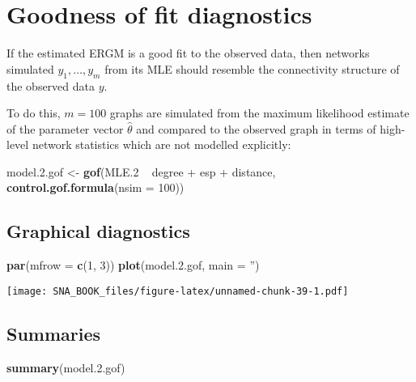 \documentclass[]{book}
\newenvironment{Shaded}{\begin{snugshade}}{\end{snugshade}}
\newcommand{\KeywordTok}[1]{\textcolor[rgb]{0.13,0.29,0.53}{\textbf{{#1}}}}
\newcommand{\DataTypeTok}[1]{\textcolor[rgb]{0.13,0.29,0.53}{{#1}}}
\newcommand{\DecValTok}[1]{\textcolor[rgb]{0.00,0.00,0.81}{{#1}}}
\newcommand{\FloatTok}[1]{\textcolor[rgb]{0.00,0.00,0.81}{{#1}}}
\newcommand{\StringTok}[1]{\textcolor[rgb]{0.31,0.60,0.02}{{#1}}}
\newcommand{\NormalTok}[1]{{#1}}
\begin{document}
\section{Goodness of fit
diagnostics}\label{goodness-of-fit-diagnostics-1}

If the estimated ERGM is a good fit to the observed data, then networks
simulated \(y_1, \dots, y_m\) from its MLE should resemble the
connectivity structure of the observed data \(y\).

To do this, \(m = 100\) graphs are simulated from the maximum likelihood
estimate of the parameter vector \(\hat{\theta}\) and compared to the
observed graph in terms of high-level network statistics which are not
modelled explicitly:

\begin{Shaded}
\begin{Highlighting}[]
\NormalTok{model}\FloatTok{.2}\NormalTok{.gof <-}\StringTok{ }\KeywordTok{gof}\NormalTok{(MLE}\FloatTok{.2} \NormalTok{~}\StringTok{ }\NormalTok{degree +}\StringTok{ }\NormalTok{esp +}\StringTok{ }\NormalTok{distance,}
                   \KeywordTok{control.gof.formula}\NormalTok{(}\DataTypeTok{nsim =} \DecValTok{100}\NormalTok{))}
\end{Highlighting}
\end{Shaded}

\subsection{Graphical diagnostics}\label{graphical-diagnostics-1}

\begin{Shaded}
\begin{Highlighting}[]
\KeywordTok{par}\NormalTok{(}\DataTypeTok{mfrow =} \KeywordTok{c}\NormalTok{(}\DecValTok{1}\NormalTok{, }\DecValTok{3}\NormalTok{))}
\KeywordTok{plot}\NormalTok{(model}\FloatTok{.2}\NormalTok{.gof, }\DataTypeTok{main =} \StringTok{''}\NormalTok{)}
\end{Highlighting}
\end{Shaded}

\texttt{[image: SNA\_BOOK\_files/figure-latex/unnamed-chunk-39-1.pdf]}

\subsection{Summaries}\label{summaries-1}

\begin{Shaded}
\begin{Highlighting}[]
\KeywordTok{summary}\NormalTok{(model}\FloatTok{.2}\NormalTok{.gof)}
\end{Highlighting}
\end{Shaded}
\end{document}
